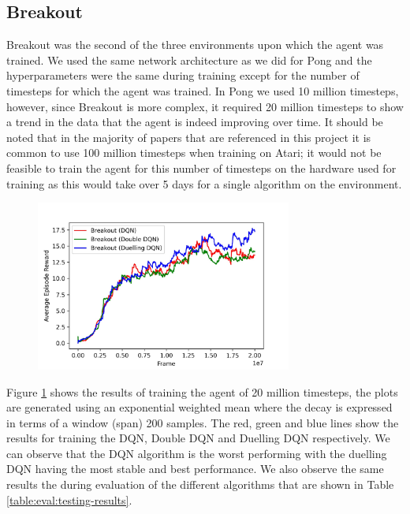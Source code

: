 \subsection{Breakout}
Breakout was the second of the three environments upon which the agent was trained. We used the same network architecture as we did for Pong and the hyperparameters were the same during training except for the number of timesteps for which the agent was trained. In Pong we used 10 million timesteps, however, since Breakout is more complex, it required 20 million timesteps to show a trend in the data that the agent is indeed improving over time. It should be noted that in the majority of papers that are referenced in this project it is common to use 100 million timesteps when training on Atari; it would not be feasible to train the agent for this number of timesteps on the hardware used for training as this would take over 5 days for a single algorithm on the environment.

\begin{figure}[htbp]
  \centering
  \includegraphics[width=0.75\textwidth]{chapters/chapter5/images/breakout_plot.jpg}
  \caption[Breakout Training results]{
    \label{fig:breakout-train-results}
  }
\end{figure}

Figure \ref{fig:breakout-train-results} shows the results of training the agent of 20 million timesteps, the plots are generated using an exponential weighted mean where the decay is expressed in terms of a window (span) 200 samples. The red, green and blue lines show the results for training the DQN, Double DQN and Duelling DQN respectively. We can observe that the DQN algorithm is the worst performing with the duelling DQN having the most stable and best performance. We also observe the same results the during evaluation of the different algorithms that are shown in Table \ref{table:eval:testing-results}.

